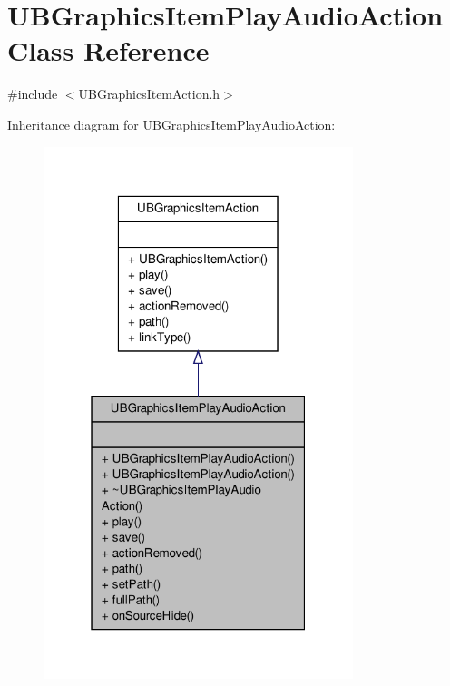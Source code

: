 \hypertarget{class_u_b_graphics_item_play_audio_action}{\section{U\-B\-Graphics\-Item\-Play\-Audio\-Action Class Reference}
\label{db/d0c/class_u_b_graphics_item_play_audio_action}
}


{\ttfamily \#include $<$U\-B\-Graphics\-Item\-Action.\-h$>$}



Inheritance diagram for U\-B\-Graphics\-Item\-Play\-Audio\-Action\-:
\nopagebreak
\begin{figure}[H]
\begin{center}
\leavevmode
\includegraphics[width=256pt]{d1/d8b/class_u_b_graphics_item_play_audio_action__inherit__graph}
\end{center}
\end{figure}


